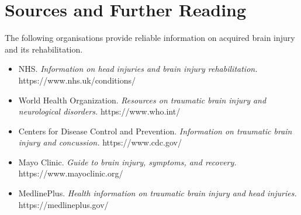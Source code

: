\section*{Sources and Further Reading}
The following organisations provide reliable information on acquired brain injury and its rehabilitation.

\begin{itemize}
    \item NHS. \textit{Information on head injuries and brain injury rehabilitation.} https://www.nhs.uk/conditions/
    \item World Health Organization. \textit{Resources on traumatic brain injury and neurological disorders.} https://www.who.int/
    \item Centers for Disease Control and Prevention. \textit{Information on traumatic brain injury and concussion.} https://www.cdc.gov/
    \item Mayo Clinic. \textit{Guide to brain injury, symptoms, and recovery.} https://www.mayoclinic.org/
    \item MedlinePlus. \textit{Health information on traumatic brain injury and head injuries.} https://medlineplus.gov/
\end{itemize}
